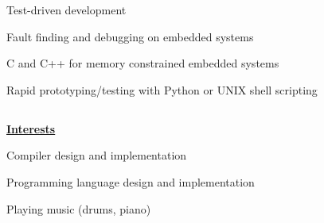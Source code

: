 \documentclass[6pt]{article}
\begin{document}
\begin{minipage}{15em}
\noindent
\begin{itemize}
{\small \raggedright
    \item Test-driven development
    \item Fault finding and debugging on embedded systems
    \item C and C++ for memory constrained embedded systems
    \item Rapid prototyping/testing with Python or UNIX shell scripting
}
\end{itemize}

\subsection*{}
{\selectfont \underline{\textbf{Interests}}}

\noindent
\begin{itemize}
{\small \raggedright
    \item Compiler design and implementation
    \item Programming language design and implementation
    \item Playing music (drums, piano)
}
\end{itemize}
\end{minipage}
%
%
\end{document}
